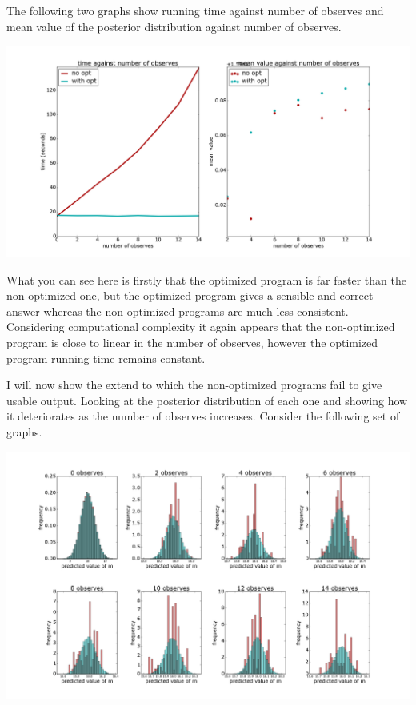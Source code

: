 \documentclass[a4paper]{article}
\begin{document}
The following two graphs show running time against number of observes and mean value of the posterior distribution against number of observes.

\centerline{\includegraphics[width=16cm]{images/removing_observes_1.png}}

What you can see here is firstly that the optimized program is far faster than the non-optimized one, but the optimized program gives a sensible and correct answer whereas the non-optimized programs are much less consistent. Considering computational complexity it again appears that the non-optimized program is close to linear in the number of observes, however the optimized program running time remains constant.

I will now show the extend to which the non-optimized programs fail to give usable output. Looking at the posterior distribution of each one and showing how it deteriorates as the number of observes increases. Consider the following set of graphs.

\centerline{\includegraphics[width=16cm]{images/removing_observes_2.png}}
\end{document}

